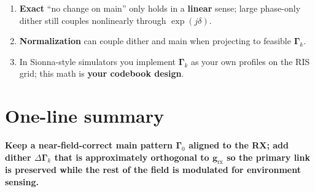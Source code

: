 \documentclass[11pt,a4paper]{article}
\newcommand{\rx}{\mathrm{rx}}
\begin{document}
\begin{enumerate}
\item \textbf{Exact} ``no change on main'' only holds in a \textbf{linear} sense; large phase-only dither still couples nonlinearly through $\exp(j\delta)$.
\item \textbf{Normalization} can couple dither and main when projecting to feasible $\bm{\Gamma}_k$.
\item In Sionna-style simulators you implement $\bm{\Gamma}_k$ as your own profiles on the RIS grid; this math is \textbf{your codebook design}.
\end{enumerate}

\section{One-line summary}

\textbf{Keep a near-field-correct main pattern $\bm{\Gamma}_0$ aligned to the RX; add dither $\Delta\bm{\Gamma}_k$ that is approximately orthogonal to $\mathbf{g}_{\rx}$ so the primary link is preserved while the rest of the field is modulated for environment sensing.}
\end{document}
